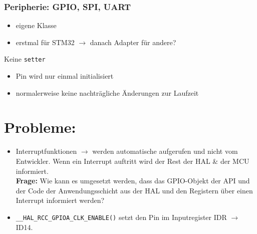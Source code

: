 \subsubsection*{Peripherie: GPIO, SPI, UART}
\begin{itemize}
	\item eigene Klasse
	\item erstmal für STM32 $\rightarrow$ danach Adapter für andere?
\end{itemize}

Keine \texttt{setter}
\begin{itemize}
	\item Pin wird nur einmal initialisiert
	\item normalerweise keine nachträgliche Änderungen zur Laufzeit
\end{itemize}

\section*{Probleme:}
\begin{itemize}
	\item Interruptfunktionen $\rightarrow$ werden automatische aufgerufen und nicht vom Entwickler. Wenn ein Interrupt auftritt wird der Rest der HAL \& der MCU informiert.\\ \textbf{Frage:} Wie kann es umgesetzt werden, dass das GPIO-Objekt der API und der Code der Anwendungsschicht aus der HAL und den Registern über einen Interrupt informiert werden?
	\item \texttt{\_\_HAL\_RCC\_GPIOA\_CLK\_ENABLE()} setzt den Pin im Inputregister IDR $\rightarrow$ ID14.
	
\end{itemize}

